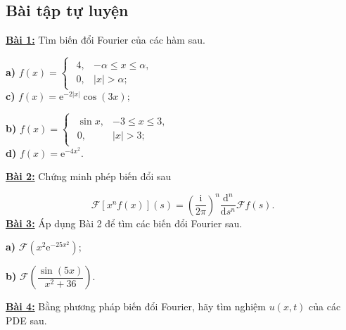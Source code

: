 \documentclass[10pt, a4paper]{article}
\begin{document}
	\subsection{Bài tập tự luyện}
	\textbf{\color{red}\underline{Bài 1:}} Tìm biến đổi Fourier của các hàm sau.\begin{multicols}{2}
		\begin{flushleft}
			\textbf{a) }$f(x)=\begin{cases}
				\begin{array}{ll}
					4, & -\alpha\le x\le\alpha, \\
					0, & |x|>\alpha;
				\end{array}
			\end{cases}$\\\vspace{3mm}
			\textbf{c) }$f(x)=\mathrm e^{-2|x|}\cos(3x);$
		\end{flushleft}
		\columnbreak
		\begin{flushleft}
			\textbf{b) }$f(x)=\begin{cases}
				\begin{array}{ll}
					\sin x, & -3\le x\le3, \\
					0, & |x|>3;
				\end{array}
			\end{cases}$\\\vspace{3mm}
			\textbf{d) }$f(x)=\mathrm e^{-4x^2}$.
		\end{flushleft}
	\end{multicols}
	\begin{flushleft}
		\textbf{\color{red}\underline{Bài 2:}} Chứng minh phép biến đổi sau 
	\end{flushleft}
	$$\mathcal F[x^nf(x)](s)=\left(\dfrac{\text{i}}{2\pi}\right)^n\dfrac{\text{d}^n}{\text{d}s^n}\mathcal Ff(s).$$
	\textbf{\color{red}\underline{Bài 3:}} Áp dụng Bài 2 để tìm các biến đổi Fourier sau. \begin{multicols}{2}
		\begin{flushleft}
			\textbf{a) }$\mathcal F\left(x^2\mathrm e^{-25x^2}\right)$;
		\end{flushleft}
		\columnbreak
		\begin{flushleft}
			\textbf{b) }$\mathcal F\left(\dfrac{\sin(5x)}{x^2+36}\right)$.
		\end{flushleft}
	\end{multicols}
	\begin{flushleft}
		\textbf{\color{red}\underline{Bài 4:}} Bằng phương pháp biến đổi Fourier, hãy tìm nghiệm $u(x,t)$ của các PDE sau.
	\end{flushleft}
\end{document}
